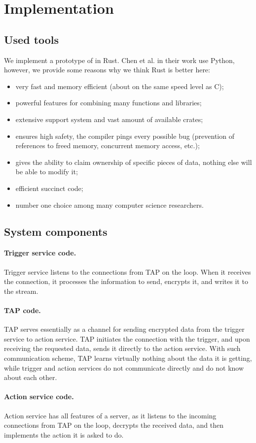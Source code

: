 \section{Implementation}
\label{sec:implementation}

\subsection{Used tools}

We implement a prototype of \sys in Rust. Chen et al. \cite{DBLP:conf/sp/ChenCWSCF21} in their work use Python, however, we provide some reasons why we think Rust is better here: 
\begin{itemize}
	\item very fast and memory efficient (about on the same speed level as C);
	\item powerful features for combining many functions and libraries;
	\item extensive support system and vast amount of available crates;
	\item ensures high safety, the compiler pings every possible bug (prevention of references to freed memory, concurrent memory access, etc.);
	\item gives the ability to claim ownership of specific pieces of data, nothing else will be able to modify it;
	\item efficient succinct code;
	\item number one choice among many computer science researchers.
\end{itemize}

\subsection{System components}
\paragraph{Trigger service code.}
Trigger service listens to the connections from TAP on the loop. When it receives the connection, it
processes the information to send, encrypts it, and writes it to the stream.

\paragraph{TAP code.}
TAP serves essentially as a channel for sending encrypted data from the trigger service to action service. 
TAP initiates the connection with the trigger, and upon receiving the requested data, sends it directly to
the action service. With such communication scheme, TAP learns virtually nothing about the data it is
getting, while trigger and action services do not communicate directly and do not know about each other.


\paragraph{Action service code.}
Action service has all features of a server, as it listens to the incoming connections from TAP on the loop,
decrypts the received data, and then implements the action it is asked to do.
